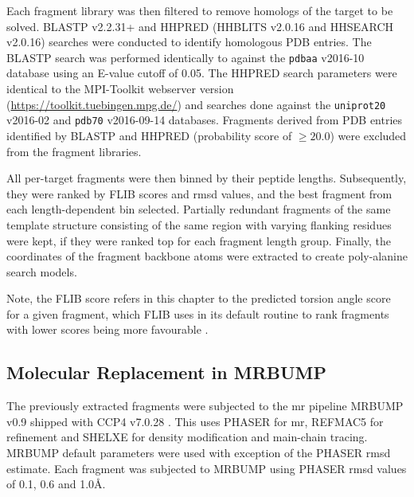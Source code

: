 Each fragment library was then filtered to remove homologs of the target to be solved. BLASTP v2.2.31+ \cite{Altschul1990-og,Camacho2009-th} and HHPRED (HHBLITS v2.0.16 and HHSEARCH v2.0.16) \cite{Soding2005-sx} searches were conducted to identify homologous PDB entries. The BLASTP search was performed identically to \textcite{De_Oliveira2015-kb} against the \texttt{pdbaa} v2016-10 database using an E-value cutoff of 0.05. The HHPRED search parameters were identical to the MPI-Toolkit \cite{Biegert2006-cb} webserver version (\url{https://toolkit.tuebingen.mpg.de/}) and searches done against the \texttt{uniprot20} v2016-02 and \texttt{pdb70} v2016-09-14 databases. Fragments derived from PDB entries identified by BLASTP and HHPRED (probability score of $\geq20.0$) were excluded from the fragment libraries.

All per-target fragments were then binned by their peptide lengths. Subsequently, they were ranked by FLIB scores and \gls{rmsd} values, and the best fragment from each length-dependent bin selected. Partially redundant fragments of the same template structure consisting of the same region with varying flanking residues were kept, if they were ranked top for each fragment length group. Finally, the coordinates of the fragment backbone atoms were extracted to create poly-alanine search models.

Note, the FLIB score refers in this chapter to the predicted torsion angle score for a given fragment, which FLIB uses in its default routine to rank fragments with lower scores being more favourable \cite{De_Oliveira2015-kb}. 

\subsection{Molecular Replacement in MRBUMP}
The previously extracted fragments were subjected to the \gls{mr} pipeline MRBUMP v0.9 shipped with CCP4 v7.0.28 \cite{Keegan2018-kn}. This uses PHASER \cite{McCoy2007-mp} for \gls{mr}, REFMAC5 \cite{Murshudov2011-ww} for refinement and SHELXE \cite{Thorn2013-le} for density modification and main-chain tracing. MRBUMP default parameters were used with exception of the PHASER \gls{rmsd} estimate. Each fragment was subjected to MRBUMP using PHASER \gls{rmsd} values of 0.1, 0.6 and 1.0\AA.

